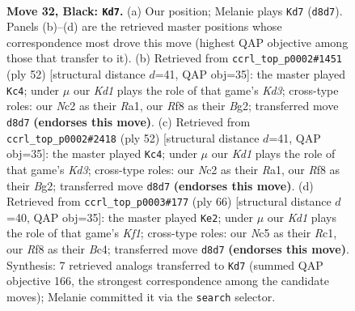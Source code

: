 \documentclass[11pt]{article}
\begin{document}
\clearpage

\begin{figure}[p]\centering
\begin{subfigure}{0.46\textwidth}\centering
\resizebox{\linewidth}{!}{%
\newchessgame
\chessboard[
  setfen={3k1r2/1pp1p2p/6p1/pNn5/5P1P/2P5/P1n2PK1/2B4R b - - 10 32},
  showmover=false,
  pgfstyle=straightmove, color=movearrow, markmove={d8-d7}
]}
\caption{}
\end{subfigure}\hfill
\begin{subfigure}{0.46\textwidth}\centering
\resizebox{\linewidth}{!}{%
\newchessgame
\chessboard[
  setfen={1k5r/pp3p1p/2p5/Pnb2N2/5P2/3KP3/5PBP/R7 w - - 5 27},
  showmover=false,
  pgfstyle=straightmove, color=movearrow, markmove={d3-c4}
]}
\caption{}
\end{subfigure}
\\[4pt]
\begin{subfigure}{0.46\textwidth}\centering
\resizebox{\linewidth}{!}{%
\newchessgame
\chessboard[
  setfen={1k5r/pp3p1p/2p5/Pnb2N2/5P2/3KP3/5PBP/R7 w - - 4 27},
  showmover=false,
  pgfstyle=straightmove, color=movearrow, markmove={d3-c4}
]}
\caption{}
\end{subfigure}\hfill
\begin{subfigure}{0.46\textwidth}\centering
\resizebox{\linewidth}{!}{%
\newchessgame
\chessboard[
  setfen={6k1/1r2bppp/2n1p3/8/2BPP3/2p3P1/2N2P1P/2R2K2 w - - 10 34},
  showmover=false,
  pgfstyle=straightmove, color=movearrow, markmove={f1-e2}
]}
\caption{}
\end{subfigure}
\caption{\textbf{Move 32, Black: \texttt{Kd7}.} (a) Our position; Melanie plays \texttt{Kd7} (\texttt{d8d7}). Panels (b)--(d) are the retrieved master positions whose correspondence most drove this move (highest QAP objective among those that transfer to it). (b) Retrieved from \texttt{ccrl\_top\_p0002\#1451} (ply 52) [structural distance $d$=41, QAP obj=35]: the master played \texttt{Kc4}; under $\mu$ our \emph{Kd1} plays the role of that game's \emph{Kd3}; cross-type roles: our \emph{N}c2 as their \emph{R}a1, our \emph{R}f8 as their \emph{B}g2; transferred move \texttt{d8d7} \textbf{(endorses this move)}. (c) Retrieved from \texttt{ccrl\_top\_p0002\#2418} (ply 52) [structural distance $d$=41, QAP obj=35]: the master played \texttt{Kc4}; under $\mu$ our \emph{Kd1} plays the role of that game's \emph{Kd3}; cross-type roles: our \emph{N}c2 as their \emph{R}a1, our \emph{R}f8 as their \emph{B}g2; transferred move \texttt{d8d7} \textbf{(endorses this move)}. (d) Retrieved from \texttt{ccrl\_top\_p0003\#177} (ply 66) [structural distance $d$=40, QAP obj=35]: the master played \texttt{Ke2}; under $\mu$ our \emph{Kd1} plays the role of that game's \emph{Kf1}; cross-type roles: our \emph{N}c5 as their \emph{R}c1, our \emph{R}f8 as their \emph{B}c4; transferred move \texttt{d8d7} \textbf{(endorses this move)}. Synthesis: 7 retrieved analogs transferred to \texttt{Kd7} (summed QAP objective 166, the strongest correspondence among the candidate moves); Melanie committed it via the \texttt{search} selector.}
\label{fig:thought-m63}
\end{figure}
\end{document}
